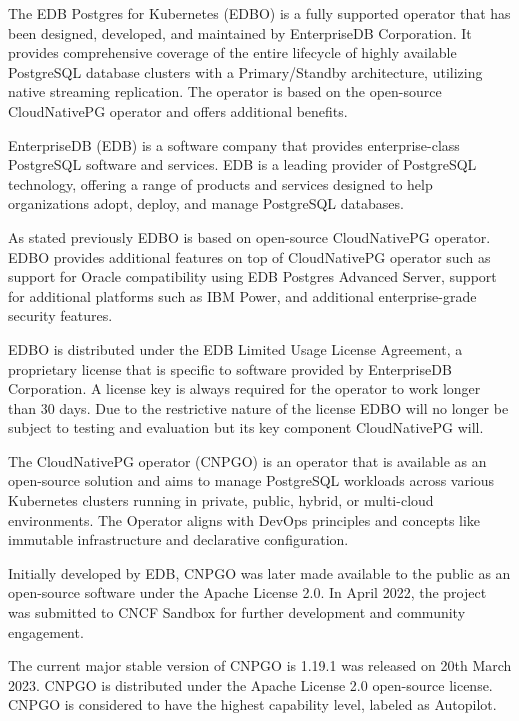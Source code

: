 The EDB Postgres for Kubernetes (EDBO) is a fully supported operator that has been designed, developed, and maintained by EnterpriseDB Corporation. It provides comprehensive coverage of the entire lifecycle of highly available PostgreSQL database clusters with a Primary/Standby architecture, utilizing native streaming replication. The operator is based on the open-source CloudNativePG operator and offers additional benefits. \cite{OperatorHubEDB}

EnterpriseDB (EDB) is a software company that provides enterprise-class PostgreSQL software and services. EDB is a leading provider of PostgreSQL technology, offering a range of products and services designed to help organizations adopt, deploy, and manage PostgreSQL databases. \cite{EDB}

As stated previously EDBO is based on open-source CloudNativePG operator. EDBO provides additional features on top of CloudNativePG operator such as support for Oracle compatibility using EDB Postgres Advanced Server, support for additional platforms such as IBM Power, and additional enterprise-grade security features. \cite{EDBdocu}

EDBO is distributed under the EDB Limited Usage License Agreement, a proprietary license that is specific to software provided by EnterpriseDB Corporation. A license key is always required for the operator to work longer than 30 days. \cite{EDBdocuLicence} Due to the restrictive nature of the license EDBO will no longer be subject to testing and evaluation but its key component CloudNativePG will.

The CloudNativePG operator (CNPGO) is an operator that is available as an open-source solution and aims to manage PostgreSQL workloads across various Kubernetes clusters running in private, public, hybrid, or multi-cloud environments. The Operator aligns with DevOps principles and concepts like immutable infrastructure and declarative configuration. \cite{CNPGdocu}

Initially developed by EDB, CNPGO was later made available to the public as an open-source software under the Apache License 2.0. In April 2022, the project was submitted to CNCF Sandbox for further development and community engagement. \cite{CNPGdocu}

The current major stable version of CNPGO is 1.19.1 was released on 20th March 2023. \cite{CNPGreleases} CNPGO is distributed under the Apache License 2.0 open-source license. CNPGO is considered to have the highest capability level, labeled as Autopilot. \cite{CNPGdocu}

